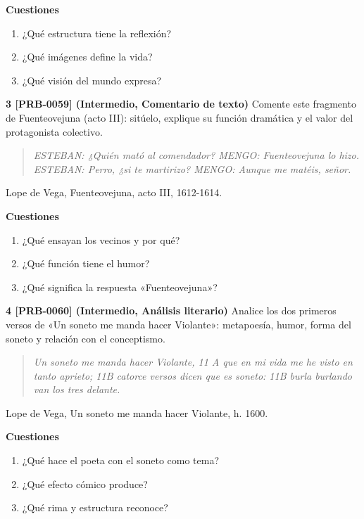 \documentclass{book}
\begin{document}
\begin{tcolorbox}[title={Ejercicios}, studiumworked, breakable]
\noindent\textbf{Cuestiones}
\begin{enumerate}
\item ¿Qué estructura tiene la reflexión?
\item ¿Qué imágenes define la vida?
\item ¿Qué visión del mundo expresa?
\end{enumerate}

\noindent\textbf{3 [PRB-0059] (Intermedio, Comentario de texto)}
Comente este fragmento de Fuenteovejuna (acto III): sitúelo, explique su función dramática y el valor del protagonista colectivo.


\begin{quote}
\itshape ESTEBAN: ¿Quién mató al comendador? MENGO: Fuenteovejuna lo hizo. ESTEBAN: Perro, ¿si te martirizo? MENGO: Aunque me matéis, señor.
\end{quote}
{\noindent\footnotesize Lope de Vega, Fuenteovejuna, acto III, 1612-1614.\par}

\noindent\textbf{Cuestiones}
\begin{enumerate}
\item ¿Qué ensayan los vecinos y por qué?
\item ¿Qué función tiene el humor?
\item ¿Qué significa la respuesta «Fuenteovejuna»?
\end{enumerate}

\noindent\textbf{4 [PRB-0060] (Intermedio, Análisis literario)}
Analice los dos primeros versos de «Un soneto me manda hacer Violante»: metapoesía, humor, forma del soneto y relación con el conceptismo.


\begin{quote}
\itshape Un soneto me manda hacer Violante, 11 A que en mi vida me he visto en tanto aprieto; 11B catorce versos dicen que es soneto: 11B burla burlando van los tres delante.
\end{quote}
{\noindent\footnotesize Lope de Vega, Un soneto me manda hacer Violante, h. 1600.\par}

\noindent\textbf{Cuestiones}
\begin{enumerate}
\item ¿Qué hace el poeta con el soneto como tema?
\item ¿Qué efecto cómico produce?
\item ¿Qué rima y estructura reconoce?
\end{enumerate}


\end{tcolorbox}
\end{document}
